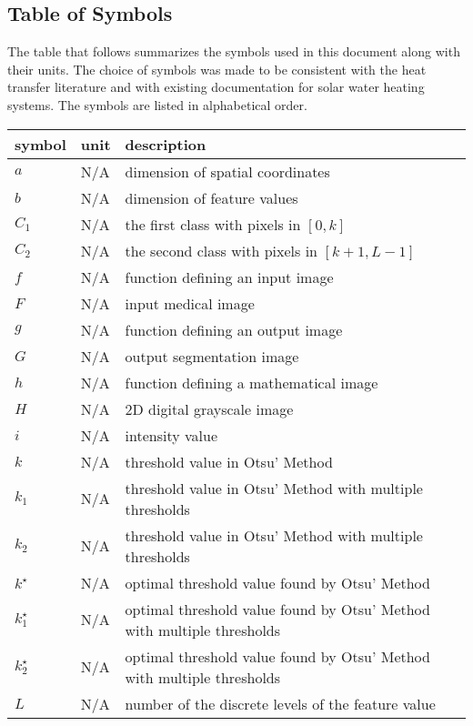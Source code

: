 \documentclass[12pt]{article}
\begin{document}
\subsection{Table of Symbols}

The table that follows summarizes the symbols used in this document along with
their units.  The choice of symbols was made to be consistent with the heat
transfer literature and with existing documentation for solar water heating
systems.  The symbols are listed in alphabetical order.

\renewcommand{\arraystretch}{1.2}
\noindent \begin{longtable*}{l l p{12cm}} \toprule
\textbf{symbol} & \textbf{unit} & \textbf{description}\\
\midrule 
$a$ & N/A & dimension of spatial coordinates
\\
$b$ & N/A & dimension of feature values
\\
$C_{1}$ & N/A & the first class with pixels in $[0, k]$
\\
$C_{2}$ & N/A & the second class with pixels in $[k+1, L-1]$
\\
$f$ & N/A & function defining an input image
\\
$F$ & N/A & input medical image
\\
$g$ & N/A & function defining an output image
\\
$G$ & N/A & output segmentation image
\\
$h$ & N/A & function defining a mathematical image
\\
$H$ & N/A & 2D digital grayscale image
\\
$i$ & N/A & intensity value
\\
$k$ & N/A & threshold value in Otsu' Method
\\
$k_{1}$ & N/A & threshold value in Otsu' Method with multiple thresholds
\\
$k_{2}$ & N/A & threshold value in Otsu' Method with multiple thresholds
\\
$k^{\star}$ & N/A & optimal  threshold  value found by Otsu' Method
\\
$k^{\star}_{1}$ & N/A & optimal  threshold  value found by Otsu' Method with multiple thresholds
\\
$k^{\star}_{2}$ & N/A & optimal  threshold  value found by Otsu' Method with multiple thresholds
\\
$L$ & N/A & number  of  the  discrete  levels  of  the  feature value

\end{longtable*}
\end{document}
